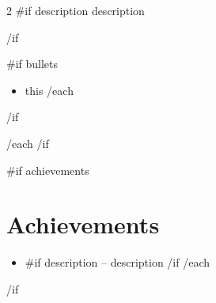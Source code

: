 \documentclass[10pt,a4paper]{article}
\begin{document}
\begin{paracol}{2}
{{#if description}}
{{description}}
\par
{{/if}}

{{#if bullets}}
\begin{itemize}
    {{#each bullets}}
    \item {{this}}
    {{/each}}
\end{itemize}
{{/if}}

\vspace{2pt}
{{/each}}
{{/if}}

{{#if achievements}}
\section{Achievements}

\begin{itemize}
    {{#each achievements}}
    \item
    \textbf{ }
    {{#if description}}
    -- {{description}}
    {{/if}}
    {{/each}}
\end{itemize}
{{/if}}

\end{paracol}
\end{document}
